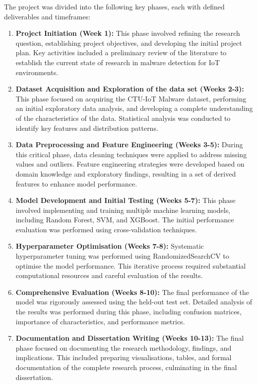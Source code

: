 The project was divided into the following key phases, each with defined deliverables and timeframes:

\begin{enumerate}
    \item \textbf{Project Initiation (Week 1):} This phase involved refining the research question, establishing project objectives, and developing the initial project plan. Key activities included a preliminary review of the literature to establish the current state of research in malware detection for IoT environments.
    
    \item \textbf{Dataset Acquisition and Exploration of the data set (Weeks 2-3):} This phase focused on acquiring the CTU-IoT Malware dataset, performing an initial exploratory data analysis, and developing a complete understanding of the characteristics of the data. Statistical analysis was conducted to identify key features and distribution patterns.
    
    \item \textbf{Data Preprocessing and Feature Engineering (Weeks 3-5):} During this critical phase, data cleaning techniques were applied to address missing values and outliers. Feature engineering strategies were developed based on domain knowledge and exploratory findings, resulting in a set of derived features to enhance model performance.
    
    \item \textbf{Model Development and Initial Testing (Weeks 5-7):} This phase involved implementing and training multiple machine learning models, including Random Forest, SVM, and XGBoost. The initial performance evaluation was performed using cross-validation techniques.
    
    \item \textbf{Hyperparameter Optimisation (Weeks 7-8):} Systematic hyperparameter tuning was performed using RandomizedSearchCV to optimise the model performance. This iterative process required substantial computational resources and careful evaluation of the results.
    
    \item \textbf{Comprehensive Evaluation (Weeks 8-10):} The final performance of the model was rigorously assessed using the held-out test set. Detailed analysis of the results was performed during this phase, including confusion matrices, importance of characteristics, and performance metrics.
    
    \item \textbf{Documentation and Dissertation Writing (Weeks 10-13):} The final phase focused on documenting the research methodology, findings, and implications. This included preparing visualisations, tables, and formal documentation of the complete research process, culminating in the final dissertation.
\end{enumerate}


